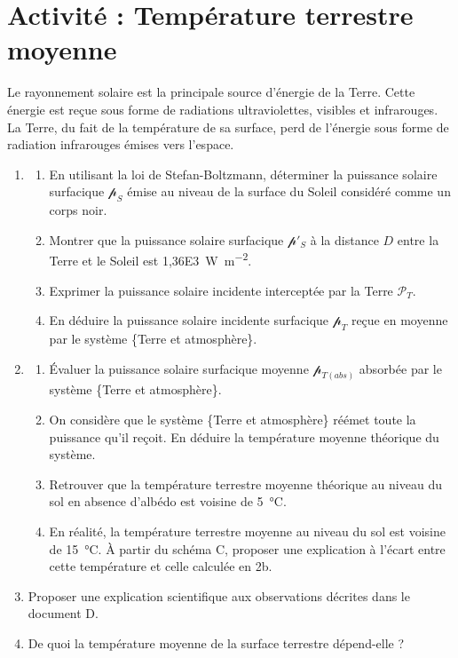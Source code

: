 \documentclass[a4paper,11pt,fleqn]{article}%
\begin{document}
\newpage
\section{Activité : Température terrestre moyenne}
Le rayonnement solaire est la principale source d'énergie de la Terre. Cette énergie est reçue sous forme de radiations ultraviolettes, visibles et infrarouges. La Terre, du fait de la température de sa surface, perd de l'énergie sous forme de radiation infrarouges émises vers l'espace.

\begin{enumerate}
	\item \begin{enumerate}
		\item En utilisant la loi de Stefan-Boltzmann, déterminer la puissance solaire surfacique $\mathcal{p}_S$ émise au niveau de la surface du Soleil considéré comme un corps noir.
		\item Montrer que la puissance solaire surfacique $\mathcal{p}'_S$ à la distance $D$ entre la Terre et le Soleil est \SI{1,36E3}{\watt\per\meter\squared}.
		\item Exprimer la puissance solaire incidente interceptée par la Terre $\mathcal{P}_T$.
		\item  En déduire la puissance solaire incidente surfacique $\mathcal{p}_T$ reçue en moyenne par le système \{Terre et atmosphère\}.
	\end{enumerate}
	\item \begin{enumerate}
		\item Évaluer la puissance solaire surfacique moyenne $\mathcal{p}_{T(abs)}$ absorbée par le système \{Terre et atmosphère\}.
		\item On considère que le système \{Terre et atmosphère\} réémet toute la puissance qu'il reçoit. En déduire la température moyenne théorique du système.
		\item Retrouver que la température terrestre moyenne théorique au niveau du sol en absence d'albédo est voisine de \SI{5}{\celsius}.
		\item En réalité, la température terrestre moyenne au niveau du sol est voisine de \SI{15}{\celsius}. À partir du schéma C, proposer une explication à l'écart entre cette température et celle calculée en 2b.
	\end{enumerate}
	\item Proposer une explication scientifique aux observations décrites dans le document D.
	\item De quoi la température moyenne de la surface terrestre dépend-elle ?
\end{enumerate}
\end{document}
